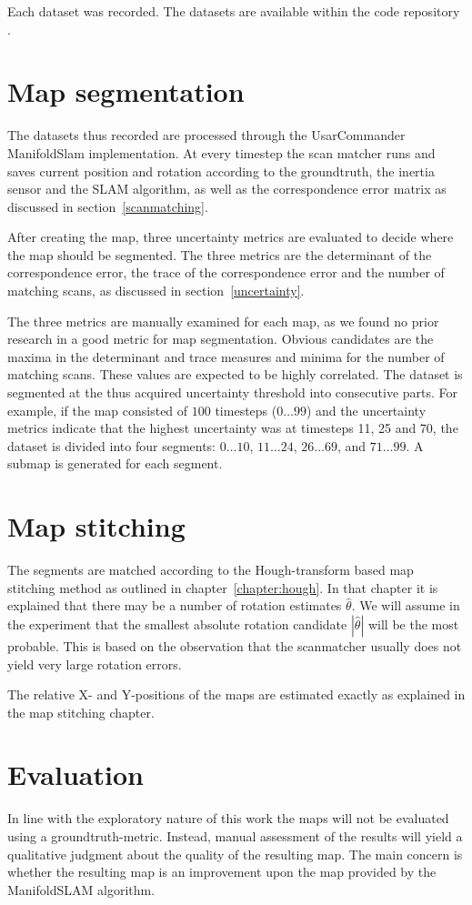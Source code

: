Each dataset was recorded. The datasets are available within the code repository \cite{github}.

\section{Map segmentation}
The datasets thus recorded are processed through the UsarCommander ManifoldSlam implementation. At every timestep the scan matcher runs and saves current position and rotation according to the groundtruth, the inertia sensor and the SLAM algorithm, as well as the correspondence error matrix as discussed in section~\ref{scanmatching}.

After creating the map, three uncertainty metrics are evaluated to decide where the map should be segmented. The three metrics are the determinant of the correspondence error, the trace of the correspondence error and the number of matching scans, as discussed in section~\ref{uncertainty}.

The three metrics are manually examined for each map, as we found no prior research in a good metric for map segmentation. Obvious candidates are the maxima in the determinant and trace measures and minima for the number of matching scans. These values are expected to be highly correlated. The dataset is segmented at the thus acquired uncertainty threshold into consecutive parts. For example, if the map consisted of $100$ timesteps ($0 \ldots 99$) and the uncertainty metrics indicate that the highest uncertainty was at timesteps 11, 25 and 70, the dataset is divided into four segments: $0 \ldots 10$, $11 \ldots 24$, $26 \ldots 69$, and $71 \ldots 99$. A submap is generated for each segment.

\section{Map stitching}
The segments are matched according to the Hough-transform based map stitching method as outlined in chapter~\ref{chapter:hough}. In that chapter it is explained that there may be a number of rotation estimates $\hat \theta$. We will assume in the experiment that the smallest absolute rotation candidate $|\hat \theta|$ will be the most probable. This is based on the observation that the scanmatcher usually does not yield very large rotation errors.

The relative X- and Y-positions of the maps are estimated exactly as explained in the map stitching chapter.

\section{Evaluation}
In line with the exploratory nature of this work the maps will not be evaluated using a groundtruth-metric. Instead, manual assessment of the results will yield a qualitative judgment about the quality of the resulting map. The main concern is whether the resulting map is an improvement upon the map provided by the ManifoldSLAM algorithm.